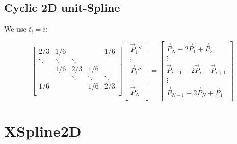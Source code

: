 \documentclass[aps,12pt]{revtex4}
\begin{document}
\subsection{Cyclic 2D unit-Spline}

We use $t_i=i$:

\begin{equation}
\begin{bmatrix}
2/3 & 1/6 &   &   & 1/6 \\
\ddots & \ddots & \ddots &   &   \\
  & 1/6 & 2/3 & 1/6 &  \\
  &   & \ddots & \ddots & \ddots\\
1/6 &   &   & 1/6 & 2/3\\
\end{bmatrix}
\begin{bmatrix}
\vec{P}_1''\\
\vdots\\
\vec{P}_i''\\
\vdots\\
\vec{P}_N\\
\end{bmatrix}
=
\begin{bmatrix}
\vec{P}_N - 2\vec{P}_1 + \vec{P}_2\\
\vdots \\
\vec{P}_{i-1} - 2\vec{P}_i + \vec{P}_{i+1} \\
\vdots\\
\vec{P}_{N-1} - 2\vec{P}_N + \vec{P}_1\\
\end{bmatrix}
\end{equation}

\section{XSpline2D}
\end{document}
